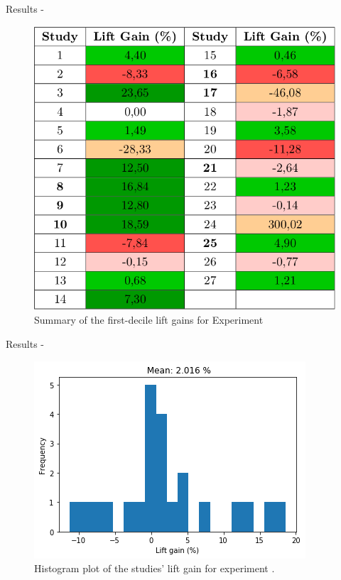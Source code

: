 
\begin{frame}{Results - \fullNameExperimentII{}} \pause
    \begin{figure}
        \centering
        \includegraphics[width=.6\linewidth]{fig/ch4-table-exp-ii.png}
        \caption{Summary of the first-decile lift gains for Experiment \nameExperimentII}
    \end{figure}
\end{frame}


\begin{frame}{Results - \fullNameExperimentII{}}
    \begin{figure}
       \centering
       \includegraphics[width=.8\linewidth]{fig/ch4-lift-hist-plot-exp-ii.png}
       \caption{Histogram plot of the studies' lift gain for experiment \nameExperimentII{}.}
       \label{fig:lift-hist-plot-exp-ii}
    \end{figure}
\end{frame}


